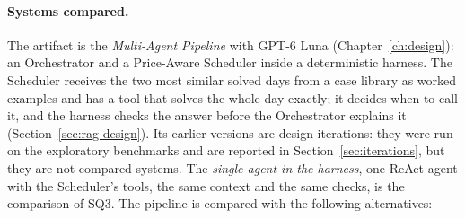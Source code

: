 \documentclass[12pt,a4paper]{report}
\begin{document}
\paragraph{Systems compared.} The artifact is the \emph{Multi-Agent
Pipeline} with GPT-6 Luna (Chapter~\ref{ch:design}): an Orchestrator and
a Price-Aware Scheduler inside a deterministic harness. The Scheduler
receives the two most similar solved days from a case library as worked
examples and has a tool that solves the whole day exactly; it decides
when to call it, and the harness checks the answer before the
Orchestrator explains it (Section~\ref{sec:rag-design}). Its earlier
versions are design iterations: they were run on the exploratory
benchmarks and are reported in Section~\ref{sec:iterations}, but they
are not compared systems. The \emph{single agent in the harness}, one
ReAct agent with the Scheduler's tools, the same context and the same
checks, is the comparison of SQ3. The pipeline is compared with the
following alternatives:
\end{document}
